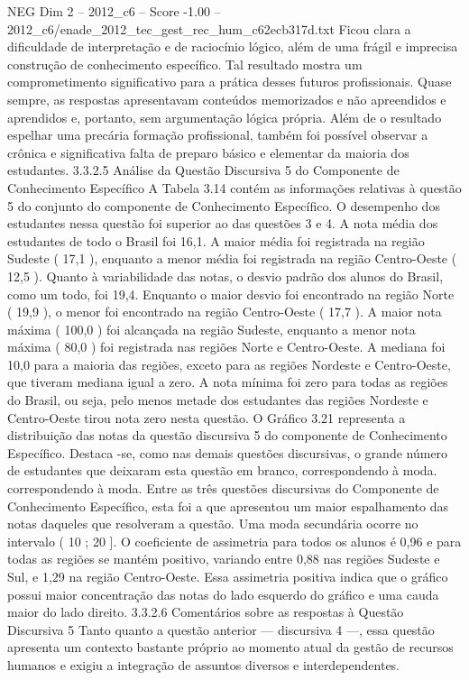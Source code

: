 \begin{textsample}{NEG Dim 2 – 2012\_c6 – Score -1.00 – 2012\_c6/enade\_2012\_tec\_gest\_rec\_hum\_c62ecb317d.txt}
Ficou clara a dificuldade de interpretação e de raciocínio lógico, além de uma frágil e imprecisa construção de conhecimento específico.
Tal resultado mostra um comprometimento significativo para a prática desses futuros profissionais.
Quase sempre, as respostas apresentavam conteúdos memorizados e não apreendidos e aprendidos e, portanto, sem argumentação lógica própria.
Além de o resultado espelhar uma precária formação profissional, também foi possível observar a crônica e significativa falta de preparo básico e elementar da maioria dos estudantes. 3.3.2.5 Análise da Questão Discursiva 5 do Componente de Conhecimento Específico A Tabela 3.14 contém as informações relativas à questão 5 do conjunto do componente de Conhecimento Específico.
O desempenho dos estudantes nessa questão foi superior ao das questões 3 e 4.
A nota média dos estudantes de todo o Brasil foi 16,1.
A maior média foi registrada na região Sudeste ( 17,1 ), enquanto a menor média foi registrada na região Centro-Oeste ( 12,5 ).
Quanto à variabilidade das notas, o desvio padrão dos alunos do Brasil, como um todo, foi 19,4.
Enquanto o maior desvio foi encontrado na região Norte ( 19,9 ), o menor foi encontrado na região Centro-Oeste ( 17,7 ).
A maior nota máxima ( 100,0 ) foi alcançada na região Sudeste, enquanto a menor nota máxima ( 80,0 ) foi registrada nas regiões Norte e Centro-Oeste.
A mediana foi 10,0 para a maioria das regiões, exceto para as regiões Nordeste e Centro-Oeste, que tiveram mediana igual a zero.
A nota mínima foi zero para todas as regiões do Brasil, ou seja, pelo menos metade dos estudantes das regiões Nordeste e Centro-Oeste tirou nota zero nesta questão.
O Gráfico 3.21 representa a distribuição das notas da questão discursiva 5 do componente de Conhecimento Específico.
Destaca -se, como nas demais questões discursivas, o grande número de estudantes que deixaram esta questão em branco, correspondendo à moda. correspondendo à moda.
Entre as três questões discursivas do Componente de Conhecimento Específico, esta foi a que apresentou um maior espalhamento das notas daqueles que resolveram a questão.
Uma moda secundária ocorre no intervalo ( 10 ; 20 ].
O coeficiente de assimetria para todos os alunos é 0,96 e para todas as regiões se mantém positivo, variando entre 0,88 nas regiões Sudeste e Sul, e 1,29 na região Centro-Oeste.
Essa assimetria positiva indica que o gráfico possui maior concentração das notas do lado esquerdo do gráfico e uma cauda maior do lado direito. 3.3.2.6 Comentários sobre as respostas à Questão Discursiva 5 Tanto quanto a questão anterior — discursiva 4 —, essa questão apresenta um contexto bastante próprio ao momento atual da gestão de recursos humanos e exigiu a integração de assuntos diversos e interdependentes.

\end{textsample}
